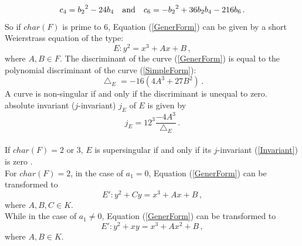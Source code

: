 \begin{equation*}
c_4={b_2}^2-24b_4\quad\hbox{and}\quad c_6=-{b_2}^2+36b_2b_4-216b_6\,.
\end{equation*}
So if $char(F)$ is prime to 6, Equation (\ref{GenerForm}) can be given
by a short Weierstrass equation of the type:
\begin{equation}
E:y^2 = x^3 + Ax + B\,, \label{SimpleForm}
\end{equation}
where $A,B\in F$.  The discriminant of the curve (\ref{GenerForm}) is
equal to the polynomial discriminant of the curve (\ref{SimpleForm}):
\begin{equation}
\bigtriangleup_{E} = -16(4A^3 + 27B^2)\,.
\end{equation}
A curve is non-singular if and only if the discriminant is unequal to zero.\\ 
 absolute invariant ($j$-invariant) $j_E$ of $E$ is given by
\begin{equation}
j_E = 12^3\frac{-4A^3}{\bigtriangleup_E}\,.\label{Invariant}
\end{equation} \\
If $char(F)=2$ or $3$, $E$ is supersingular if and only if its
$j$-invariant (\ref{Invariant}) is zero \cite{Cohen}.\\ For
$char(F)=2$, in the case of $a_1=0$, Equation (\ref{GenerForm}) can be
transformed to
\begin{equation}\label{Simple2}
E': y^2+Cy=x^3+Ax+B\,,
\end{equation}
where $A,B,C\in K$.\\
While in the case of $a_1\neq 0$, Equation (\ref{GenerForm}) can be transformed to
\begin{equation}\label{Simple3}
E': y^2+xy=x^3+Ax^2+B\,,
\end{equation}
where $A,B\in K$.\\ \ \\ 

